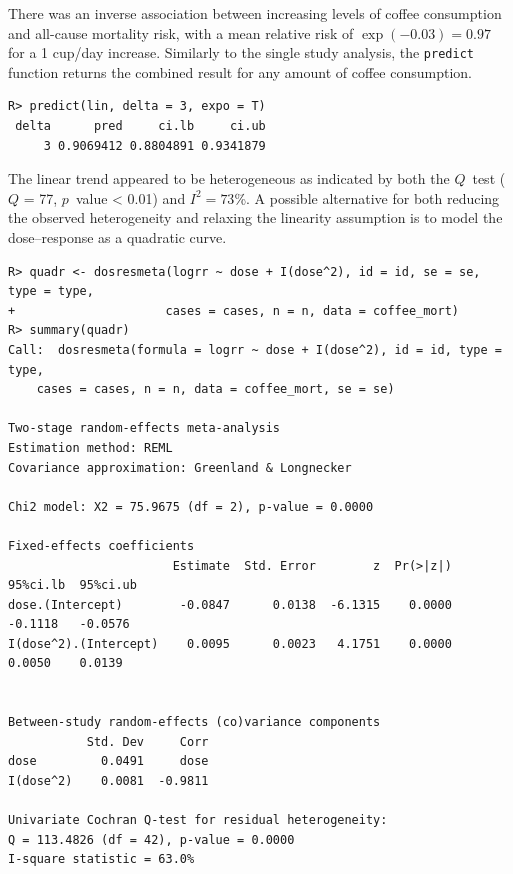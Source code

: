 \documentclass[11pt,a4paper,twoside,openany]{book}\usepackage{knitr}
\begin{document}
{\noindent There was an inverse association between increasing levels of coffee consumption and all-cause mortality risk, with a mean relative risk of $\exp(-0.03) = 0.97$ for a 1 cup/day increase. Similarly to the single study analysis, the \texttt{predict} function returns the combined result for any amount of coffee consumption.
\begin{knitrout}\footnotesize
{}\color{fgcolor}\begin{kframe}
\begin{verbatim}
R> predict(lin, delta = 3, expo = T)
 delta      pred     ci.lb     ci.ub
     3 0.9069412 0.8804891 0.9341879
\end{verbatim}
\end{kframe}
\end{knitrout}

\noindent The linear trend appeared to be heterogeneous as indicated by both the $Q$~test ($Q$ = 77, $p$~value < 0.01) and $I^2 = 73$\%.
A possible alternative for both reducing the observed heterogeneity and relaxing the linearity assumption is to model the dose--response as a quadratic curve.
\begin{knitrout}\footnotesize
{}\color{fgcolor}\begin{kframe}
\begin{verbatim}
R> quadr <- dosresmeta(logrr ~ dose + I(dose^2), id = id, se = se, type = type,
+                     cases = cases, n = n, data = coffee_mort)
R> summary(quadr)
Call:  dosresmeta(formula = logrr ~ dose + I(dose^2), id = id, type = type, 
    cases = cases, n = n, data = coffee_mort, se = se)

Two-stage random-effects meta-analysis
Estimation method: REML
Covariance approximation: Greenland & Longnecker

Chi2 model: X2 = 75.9675 (df = 2), p-value = 0.0000

Fixed-effects coefficients
                       Estimate  Std. Error        z  Pr(>|z|)  95%ci.lb  95%ci.ub
dose.(Intercept)        -0.0847      0.0138  -6.1315    0.0000   -0.1118   -0.0576
I(dose^2).(Intercept)    0.0095      0.0023   4.1751    0.0000    0.0050    0.0139


Between-study random-effects (co)variance components
           Std. Dev     Corr
dose         0.0491     dose
I(dose^2)    0.0081  -0.9811

Univariate Cochran Q-test for residual heterogeneity:
Q = 113.4826 (df = 42), p-value = 0.0000
I-square statistic = 63.0%


\end{verbatim}
\end{kframe}
\end{knitrout}}
\end{document}

